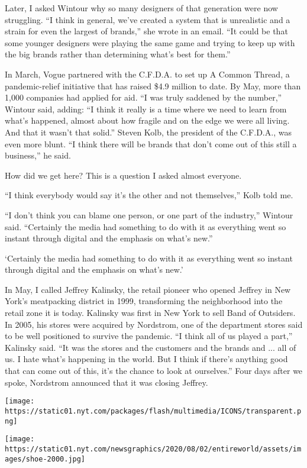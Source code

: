 Later, I asked Wintour why so many designers of that generation were now
struggling. ``I think in general, we've created a system that is
unrealistic and a strain for even the largest of brands,'' she wrote in
an email. ``It could be that some younger designers were playing the
same game and trying to keep up with the big brands rather than
determining what's best for them.''

In March, Vogue partnered with the C.F.D.A. to set up A Common Thread, a
pandemic-relief initiative that has raised \$4.9 million to date. By
May, more than 1,000 companies had applied for aid. ``I was truly
saddened by the number,'' Wintour said, adding: ``I think it really is a
time where we need to learn from what's happened, almost about how
fragile and on the edge we were all living. And that it wasn't that
solid.'' Steven Kolb, the president of the C.F.D.A., was even more
blunt. ``I think there will be brands that don't come out of this still
a business,'' he said.

How did we get here? This is a question I asked almost everyone.

``I think everybody would say it's the other and not themselves,'' Kolb
told me.

``I don't think you can blame one person, or one part of the industry,''
Wintour said. ``Certainly the media had something to do with it as
everything went so instant through digital and the emphasis on what's
new.''

`Certainly the media had something to do with it as everything went so
instant through digital and the emphasis on what's new.'

In May, I called Jeffrey Kalinsky, the retail pioneer who opened Jeffrey
in New York's meatpacking district in 1999, transforming the
neighborhood into the retail zone it is today. Kalinsky was first in New
York to sell Band of Outsiders. In 2005, his stores were acquired by
Nordstrom, one of the department stores said to be well positioned to
survive the pandemic. ``I think all of us played a part,'' Kalinsky
said. ``It was the stores and the customers and the brands and ... all
of us. I hate what's happening in the world. But I think if there's
anything good that can come out of this, it's the chance to look at
ourselves.'' Four days after we spoke, Nordstrom announced that it was
closing Jeffrey.

\texttt{[image: https://static01.nyt.com/packages/flash/multimedia/ICONS/transparent.png]}

\texttt{[image: https://static01.nyt.com/newsgraphics/2020/08/02/entireworld/assets/images/shoe-2000.jpg]}

